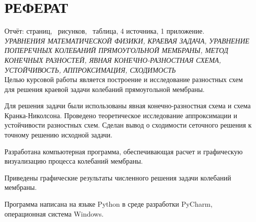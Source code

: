 
\section*{РЕФЕРАТ}
{
	Отчёт:
	\pageref{LastPage} страниц,
	\totalfigures\ рисунков,
	\totaltables\ таблица,
	4 источника,
	1 приложение.\\
	
	\textit{УРАВНЕНИЯ МАТЕМАТИЧЕСКОЙ ФИЗИКИ, КРАЕВАЯ ЗАДАЧА,  УРАВНЕНИЕ ПОПЕРЕЧНЫХ КОЛЕБАНИЙ  ПРЯМОУГОЛЬНОЙ МЕМБРАНЫ, МЕТОД КОНЕЧНЫХ РАЗНОСТЕЙ, ЯВНАЯ КОНЕЧНО-РАЗНОСТНАЯ СХЕМА, УСТОЙЧИВОСТЬ, АППРОКСИМАЦИЯ, СХОДИМОСТЬ}\\

	Целью курсовой работы является построение и исследование
разностных схем для решения краевой задачи колебаний прямоугольной мембраны.

	Для решения задачи были использованы явная конечно-разностная
схема и схема Кранка-Николсона. Проведено теоретическое исследование аппроксимации и устойчивости разностных схем. Сделан вывод о сходимости сеточного решения к точному решению исходной задачи.

	Разработана компьютерная программа, обеспечивающая расчет и
графическую визуализацию процесса колебаний мембраны.

	Приведены графические результаты численного решения задачи колебаний мембраны.

	Программа написана на языке Python в среде разработки PyCharm, операционная система Windows.
}

\setcounter{tocdepth}{3}

\newpage
\newpage
\tableofcontents
\newpage


